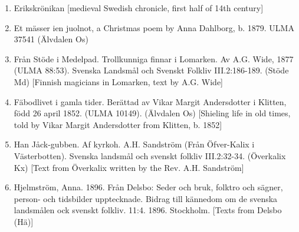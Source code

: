 \begin{enumerate}

\item[\sqbrSenum]

\label{bkm:Ref154220139}Erikskrönikan [medieval Swedish chronicle, first half of 14th century]


\item[\sqbrSenum]

Et mässer ien juolnot, a Christmas poem by Anna Dahlborg, b. 1879. ULMA 37541 (Älvdalen Os)

\item[\sqbrSenum]

\label{bkm:Ref154302565}Från Stöde i Medelpad. Trollkunniga finnar i Lomarken. Av A.G. Wide, 1877 (ULMA 88:53). Svenska Landsmål och Svenskt Folkliv III.2:186-189. (Stöde Md) [Finnish magicians in Lomarken, text by A.G. Wide]

\item[\sqbrSenum]

\label{bkm:Ref137882894}Fäbodlivet i gamla tider. Berättad av Vikar Margit Andersdotter i Klitten, född 26 april 1852. (ULMA 10149). (Älvdalen Os) [Shieling life in old times, told by Vikar Margit Andersdotter from Klitten, b. 1852]

\item[\sqbrSenum]

\label{bkm:Ref137882216}Han Jåck-gubben. Af kyrkoh. A.H. Sandström (Från Öfver-Kalix i Västerbotten). Svenska landsmål och svenskt folkliv III.2:32-34. (Överkalix Kx) [Text from Överkalix written by the Rev. A.H. Sandström]


\item[\sqbrSenum]

\label{bkm:Ref150576370}Hjelmström, Anna. 1896. Från Delsbo: Seder och bruk, folktro och sägner, person- och tidsbilder upptecknade. Bidrag till kännedom om de svenska landsmålen ock svenskt folkliv. 11:4. 1896. Stockholm. [Texts from Delsbo (Hä)]


\end{enumerate}
